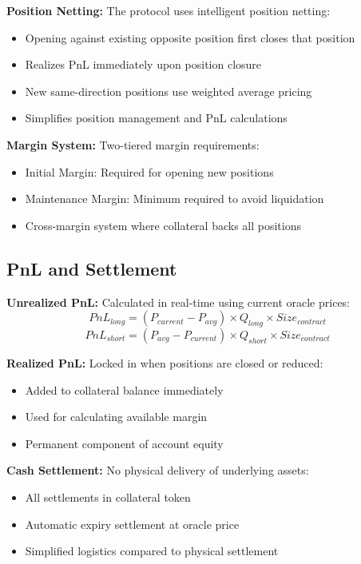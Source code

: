 \documentclass[12pt]{article}
\begin{document}
\textbf{Position Netting:} The protocol uses intelligent position netting:
\begin{itemize}
    \item Opening against existing opposite position first closes that position
    \item Realizes PnL immediately upon position closure
    \item New same-direction positions use weighted average pricing
    \item Simplifies position management and PnL calculations
\end{itemize}

\textbf{Margin System:} Two-tiered margin requirements:
\begin{itemize}
    \item Initial Margin: Required for opening new positions
    \item Maintenance Margin: Minimum required to avoid liquidation
    \item Cross-margin system where collateral backs all positions
\end{itemize}

\subsection{PnL and Settlement}

\textbf{Unrealized PnL:} Calculated in real-time using current oracle prices:
$$PnL_{long} = (P_{current} - P_{avg}) \times Q_{long} \times Size_{contract}$$
$$PnL_{short} = (P_{avg} - P_{current}) \times Q_{short} \times Size_{contract}$$

\textbf{Realized PnL:} Locked in when positions are closed or reduced:
\begin{itemize}
    \item Added to collateral balance immediately
    \item Used for calculating available margin
    \item Permanent component of account equity
\end{itemize}

\textbf{Cash Settlement:} No physical delivery of underlying assets:
\begin{itemize}
    \item All settlements in collateral token
    \item Automatic expiry settlement at oracle price
    \item Simplified logistics compared to physical settlement
\end{itemize}
\end{document}
